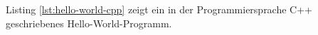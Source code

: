 \documentclass[12pt,a4paper]{scrbook}
\begin{document}


Listing \ref{lst:hello-world-cpp} zeigt ein in der Programmiersprache C++ geschriebenes Hello-World-Programm.
\end{document}
